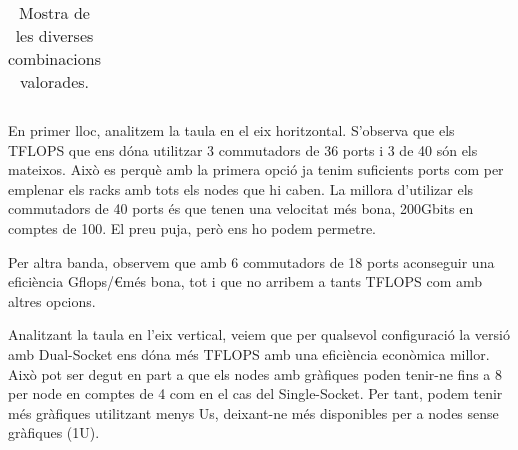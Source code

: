 \begin{table}[H]
\begin{adjustwidth}{-1.0in}{-1.0in}
\begin{center}
\begin{tabular}{ll|c|c|c|c|}
\end{tabular}
\caption{Mostra de les diverses combinacions valorades.}
\end{center}
\end{adjustwidth}
\end{table}

En primer lloc, analitzem la taula en el eix horitzontal. S'observa que els TFLOPS que ens dóna utilitzar 3 commutadors de 36 ports i 3 de 40 són els mateixos. Això es perquè amb la primera opció ja tenim suficients ports com per emplenar els racks amb tots els nodes que hi caben. La millora d'utilizar els commutadors de 40 ports és que tenen una velocitat més bona, 200Gbits en comptes de 100. El preu puja, però ens ho podem permetre.

Per altra banda, observem que amb 6 commutadors de 18 ports aconseguir una eficiència Gflops/\euro més bona, tot i que no arribem a tants TFLOPS com amb altres opcions.

Analitzant la taula en l'eix vertical, veiem que per qualsevol configuració la versió amb Dual-Socket ens dóna més TFLOPS amb una eficiència econòmica millor. Això pot ser degut en part a que els nodes amb gràfiques poden tenir-ne fins a 8 per node en comptes de 4 com en el cas del Single-Socket. Per tant, podem tenir més gràfiques utilitzant menys Us, deixant-ne més disponibles per a nodes sense gràfiques (1U).


